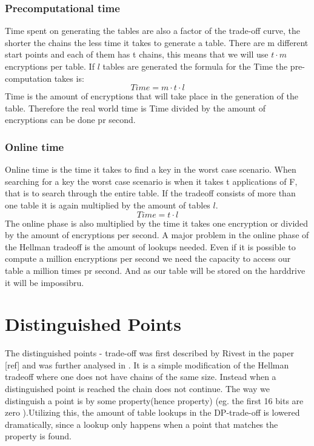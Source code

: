 \subsubsection{Precomputational time}
Time spent on generating the tables are also a factor of the trade-off
curve, the shorter the chains the less time it takes to generate a table. There are m different start points and each of them has t chains, this means that we will use $t\cdot m$ encryptions per table. If $l$ tables are generated the formula for the Time the pre-computation takes is:
\begin{equation}
  Time=m\cdot t\cdot l
\end{equation}
Time is the amount of encryptions that will take place in the generation of the table. Therefore the real world time is Time divided by the amount of encryptions can be done pr second.

\subsubsection{Online time}
Online time is the time it takes to find a key in the worst case scenario. When searching for a key the worst case scenario is when it takes t applications of F, that is to search through the entire table. If the tradeoff consists of more than one table it is again multiplied by the amount of tables $l$.
\begin{equation}
  Time=t\cdot l
\end{equation}
The online phase is also multiplied by the time it takes one encryption or divided by the amount of encryptions per second. A major problem in the online phase of the  Hellman tradeoff is the amount of lookups needed. Even if it is possible to compute a million encryptions per second we need the capacity to access our table a million times pr second. And as our table will be stored on the harddrive it will be impossibru.



\section{Distinguished Points}
\label{sec:dptheory}

The distinguished points - trade-off was first described by Rivest in
the paper [ref] and was further analysed in \cite{DP}. It is a simple modification of the Hellman tradeoff
where one does not have chains of the same size. Instead when a
distinguished point is reached the chain does not continue. The way we distinguish a point is by some property(hence property) (eg. the first 16 bits are zero ).Utilizing this, the amount of table lookups in the DP-trade-off is lowered dramatically, since a lookup only happens when a point that matches the property is found.
